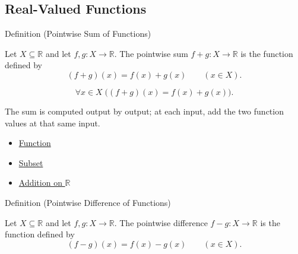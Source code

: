 
\subsection*{Real-Valued Functions}
\label{sec:real-valued-functions}

\begin{definitionbox}{Definition (Pointwise Sum of Functions)}
\begin{definition}
\label{def:pointwise-sum-of-functions}
Let $X\subseteq\mathbb{R}$ and let $f,g:X\to\mathbb{R}$.  The
pointwise sum $f+g:X\to\mathbb{R}$ is the function defined by
\[
  (f+g)(x)=f(x)+g(x)
  \qquad (x\in X).
\]
\end{definition}
\end{definitionbox}

\begin{remark*}
\[
  \forall x\in X\;\bigl((f+g)(x)=f(x)+g(x)\bigr).
\]
\end{remark*}

\begin{remark*}[Interpretation]
The sum is computed output by output; at each input, add the two function
values at that same input.
\end{remark*}

\begin{dependencies}
\begin{itemize}
  \item \hyperref[def:function]{Function}
  \item \hyperref[def:subset]{Subset}
  \item \hyperref[def:addition-on-r]{Addition on $\mathbb{R}$}
\end{itemize}
\end{dependencies}

\begin{definitionbox}{Definition (Pointwise Difference of Functions)}
\begin{definition}
\label{def:pointwise-difference-of-functions}
Let $X\subseteq\mathbb{R}$ and let $f,g:X\to\mathbb{R}$.  The
pointwise difference $f-g:X\to\mathbb{R}$ is the function defined by
\[
  (f-g)(x)=f(x)-g(x)
  \qquad (x\in X).
\]
\end{definition}
\end{definitionbox}

